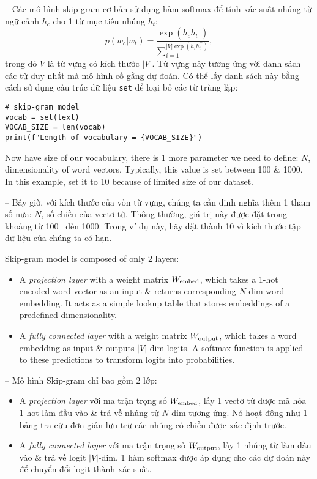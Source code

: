 \documentclass{article}
\begin{document}
\begin{itemize}
\begin{itemize}
\begin{itemize}
            -- Các mô hình skip-gram cơ bản sử dụng hàm softmax để tính xác suất nhúng từ ngữ cảnh $h_c$ cho 1 từ mục tiêu nhúng $h_t$:
            \begin{equation*}
                p(w_c|w_t) = \frac{\exp(h_ch_t^\top)}{\sum_{i=1}^{|V| \exp(h_ih_t^\top)}},
            \end{equation*}
            trong đó $V$ là từ vựng có kích thước $|V|$. Từ vựng này tương ứng với danh sách các từ duy nhất mà mô hình cố gắng dự đoán. Có thể lấy danh sách này bằng cách sử dụng cấu trúc dữ liệu {\tt set} để loại bỏ các từ trùng lặp:
            \begin{verbatim}
# skip-gram model
vocab = set(text)
VOCAB_SIZE = len(vocab)
print(f"Length of vocabulary = {VOCAB_SIZE}")
            \end{verbatim}
            Now have size of our vocabulary, there is 1 more parameter we need to define: $N$, dimensionality of word vectors. Typically, this value is set between 100 \& 1000. In this example, set it to 10 because of limited size of our dataset.

            -- Bây giờ, với kích thước của vốn từ vựng, chúng ta cần định nghĩa thêm 1 tham số nữa: $N$, số chiều của vectơ từ. Thông thường, giá trị này được đặt trong khoảng từ 100 \ đến 1000. Trong ví dụ này, hãy đặt thành 10 vì kích thước tập dữ liệu của chúng ta có hạn.

            Skip-gram model is composed of only 2 layers:
            \begin{itemize}
                \item A {\it projection layer} with a weight matrix $W_{\rm embed}$, which takes a 1-hot encoded-word vector as an input \& returns corresponding $N$-dim word embedding. It acts as a simple lookup table that stores embeddings of a predefined dimensionality.
                \item A {\it fully connected layer} with a weight matrix $W_{\rm output}$, which takes a word embedding as input \& outputs $|V|$-dim logits. A softmax function is applied to these predictions to transform logits into probabilities.
            \end{itemize}
            -- Mô hình Skip-gram chỉ bao gồm 2 lớp:
            \begin{itemize}
                \item A {\it projection layer} với ma trận trọng số $W_{\rm embed}$, lấy 1 vectơ từ được mã hóa 1-hot làm đầu vào \& trả về nhúng từ $N$-dim tương ứng. Nó hoạt động như 1 bảng tra cứu đơn giản lưu trữ các nhúng có chiều được xác định trước.
                \item A {\it fully connected layer} với ma trận trọng số $W_{\rm output}$, lấy 1 nhúng từ làm đầu vào \& trả về logit $|V|$-dim. 1 hàm softmax được áp dụng cho các dự đoán này để chuyển đổi logit thành xác suất.
            \end{itemize}


\end{itemize}
\end{itemize}
\end{itemize}
\end{document}
